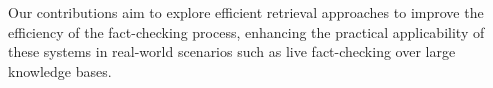     
Our contributions aim to explore efficient retrieval approaches to improve the efficiency of the fact-checking process, enhancing the practical applicability of these systems in real-world scenarios such as live fact-checking over large knowledge bases.



